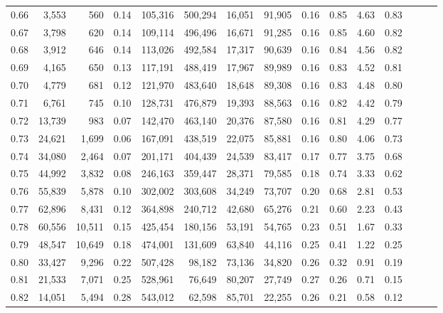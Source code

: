 \begin{tabular}{rrrrrrrrrrrrrrr}
0.66 &   3,553 &     560 &  0.14 &  105,316 &  500,294 &   16,051 &   91,905 &  0.16 &  0.85 &  4.63 &      0.83 \\
0.67 &   3,798 &     620 &  0.14 &  109,114 &  496,496 &   16,671 &   91,285 &  0.16 &  0.85 &  4.60 &      0.82 \\
0.68 &   3,912 &     646 &  0.14 &  113,026 &  492,584 &   17,317 &   90,639 &  0.16 &  0.84 &  4.56 &      0.82 \\
0.69 &   4,165 &     650 &  0.13 &  117,191 &  488,419 &   17,967 &   89,989 &  0.16 &  0.83 &  4.52 &      0.81 \\
0.70 &   4,779 &     681 &  0.12 &  121,970 &  483,640 &   18,648 &   89,308 &  0.16 &  0.83 &  4.48 &      0.80 \\
0.71 &   6,761 &     745 &  0.10 &  128,731 &  476,879 &   19,393 &   88,563 &  0.16 &  0.82 &  4.42 &      0.79 \\
0.72 &  13,739 &     983 &  0.07 &  142,470 &  463,140 &   20,376 &   87,580 &  0.16 &  0.81 &  4.29 &      0.77 \\
0.73 &  24,621 &   1,699 &  0.06 &  167,091 &  438,519 &   22,075 &   85,881 &  0.16 &  0.80 &  4.06 &      0.73 \\
0.74 &  34,080 &   2,464 &  0.07 &  201,171 &  404,439 &   24,539 &   83,417 &  0.17 &  0.77 &  3.75 &      0.68 \\
0.75 &  44,992 &   3,832 &  0.08 &  246,163 &  359,447 &   28,371 &   79,585 &  0.18 &  0.74 &  3.33 &      0.62 \\
0.76 &  55,839 &   5,878 &  0.10 &  302,002 &  303,608 &   34,249 &   73,707 &  0.20 &  0.68 &  2.81 &      0.53 \\
0.77 &  62,896 &   8,431 &  0.12 &  364,898 &  240,712 &   42,680 &   65,276 &  0.21 &  0.60 &  2.23 &      0.43 \\
0.78 &  60,556 &  10,511 &  0.15 &  425,454 &  180,156 &   53,191 &   54,765 &  0.23 &  0.51 &  1.67 &      0.33 \\
0.79 &  48,547 &  10,649 &  0.18 &  474,001 &  131,609 &   63,840 &   44,116 &  0.25 &  0.41 &  1.22 &      0.25 \\
0.80 &  33,427 &   9,296 &  0.22 &  507,428 &   98,182 &   73,136 &   34,820 &  0.26 &  0.32 &  0.91 &      0.19 \\
0.81 &  21,533 &   7,071 &  0.25 &  528,961 &   76,649 &   80,207 &   27,749 &  0.27 &  0.26 &  0.71 &      0.15 \\
0.82 &  14,051 &   5,494 &  0.28 &  543,012 &   62,598 &   85,701 &   22,255 &  0.26 &  0.21 &  0.58 &      0.12 \\

\end{tabular}
